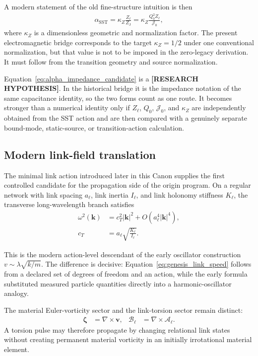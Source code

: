\documentclass[11pt]{article}
\theoremstyle{definition}
\theoremstyle{plain}
\theoremstyle{remark}
\begin{document}
A modern statement of the old fine-structure intuition is then
\begin{align}
    \alpha_{\mathrm{SST}}
    =
    \kappa_Z\frac{Z_\ell}{Z_{\mathrm J}}
    =
    \kappa_Z\frac{Q_0^2Z_\ell}{\mathcal J_0},
    \label{eq:alpha_impedance_candidate}
\end{align}
where $\kappa_Z$ is a dimensionless geometric and normalization factor. The
present electromagnetic bridge corresponds to the target $\kappa_Z=1/2$ under
one conventional normalization, but that value is not to be imposed in the
zero-legacy derivation. It must follow from the transition geometry and source
normalization.

Equation~\eqref{eq:alpha_impedance_candidate} is a \textbf{[RESEARCH
HYPOTHESIS]}. In the historical bridge it is the impedance notation of the same
capacitance identity, so the two forms count as one route. It becomes stronger
than a numerical identity only if $Z_\ell$, $Q_0$, $\mathcal J_0$, and
$\kappa_Z$ are independently obtained from the SST action and are then compared
with a genuinely separate bound-mode, static-source, or transition-action
calculation.

\subsection{Modern link-field translation}
\label{subsec:modern_link_field_translation}

The minimal link action introduced later in this Canon supplies the first
controlled candidate for the propagation side of the origin program. On a
regular network with link spacing $a_\ell$, link inertia $I_\ell$, and link
holonomy stiffness $K_\ell$, the transverse long-wavelength branch satisfies
\begin{align}
    \omega^2(\mathbf k)
    &=
    c_T^2\lvert\mathbf k\rvert^2
    +
    O(a_\ell^4\lvert\mathbf k\rvert^4),
    \\
    c_T
    &=
    a_\ell\sqrt{\frac{K_\ell}{I_\ell}}.
    \label{eq:genesis_link_speed}
\end{align}

This is the modern action-level descendant of the early oscillator construction
$v\sim \lambda\sqrt{k/m}$. The difference is decisive:
Equation~\eqref{eq:genesis_link_speed} follows from a declared set of degrees of
freedom and an action, while the early formula substituted measured particle
quantities directly into a harmonic-oscillator analogy.

The material Euler-vorticity sector and the link-torsion sector remain distinct:
\begin{align}
    \boldsymbol{\zeta}
    &=
    \nabla\times\mathbf v,
    &
    \boldsymbol{\mathcal B}_\ell
    &=
    \nabla\times\boldsymbol{\mathcal A}_\ell.
    \label{eq:material_vorticity_link_curvature_distinction}
\end{align}
A torsion pulse may therefore propagate by changing relational link states
without creating permanent material vorticity in an initially irrotational
material element.
\end{document}
